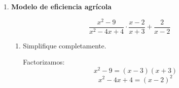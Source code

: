 \documentclass[11pt]{article}
\begin{document}
\begin{enumerate}
		\[
		\frac{2}{x}+\frac{5}{x-3}-\frac{1}{x+1}
		\]
	
		\begin{enumerate}[label=\alph*)]
		\item Exprese como una sola fracción.
		
		El denominador común es:
		\[
		x(x-3)(x+1)
		\]
		
		Entonces:
		\[
		\frac{2}{x}+\frac{5}{x-3}-\frac{1}{x+1}
		=
		\frac{2(x-3)(x+1)+5x(x+1)-x(x-3)}{x(x-3)(x+1)}
		\]
		
		Desarrollamos:
		\[
		2(x-3)(x+1)=2(x^2-2x-3)=2x^2-4x-6
		\]
		\[
		5x(x+1)=5x^2+5x
		\]
		\[
		x(x-3)=x^2-3x
		\]
		
		Luego:
		\[
		\frac{2x^2-4x-6+5x^2+5x-(x^2-3x)}{x(x-3)(x+1)}
		\]
		\[
		=
		\frac{2x^2-4x-6+5x^2+5x-x^2+3x}{x(x-3)(x+1)}
		\]
		\[
		=
		\frac{6x^2+4x-6}{x(x-3)(x+1)}
		\]
		
		Por lo tanto:
		\[
		\boxed{\frac{6x^2+4x-6}{x(x-3)(x+1)}}
		\]
		
		\item Determine restricciones.
		
		Los denominadores no pueden anularse:
		\[
		x\neq 0,\qquad x\neq 3,\qquad x\neq -1
		\]
		
		Entonces:
		\[
		\boxed{x\neq 0,\,3,\,-1}
		\]
		
		\item Analice estabilidad del modelo.
		
		El modelo no es estable en los valores
		\[
		x=0,\quad x=3,\quad x=-1,
		\]
		porque en esos puntos los denominadores se anulan y la expresión no existe. Por ello, el modelo presenta discontinuidades y no puede evaluarse en esos valores.
		\end{enumerate}
	
	\newpage	
	
	\vspace*{0.5em}
	
	\item \textbf{Modelo de eficiencia agrícola}
	
		\[
		\frac{x^2-9}{x^2-4x+4}\cdot\frac{x-2}{x+3}+\frac{2}{x-2}
		\]
	
		\begin{enumerate}[label=\alph*)]
		\item Simplifique completamente.
		
		Factorizamos:
		\[
		x^2-9=(x-3)(x+3)
		\]
		\[
		x^2-4x+4=(x-2)^2
		\]
		

\end{enumerate}
\end{enumerate}
\end{document}
